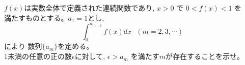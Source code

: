 $f(x)$は実数全体で定義された連続関数であり, $x>0$ で $0<f(x)<1$ を\\
満たすものとする。$a_1=1$とし,
\[\displaystyle\int_0^{a_{m-1}}f(x) dx    \,\,\,\,(m=2,3,\cdots )\]
により 数列$\{a_m\}$を定める。\\
1未満の任意の正の数$\epsilon$に対して, $\epsilon>a_m$ を満たす$m$が存在することを示せ。
\enthm
